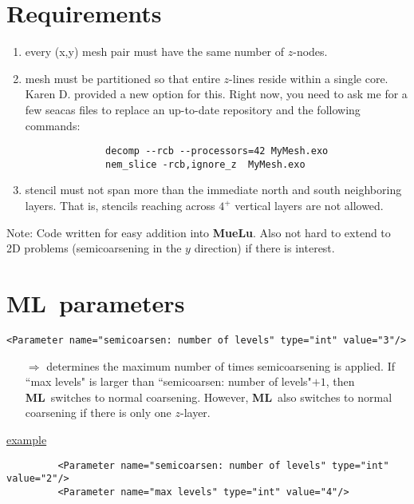 \documentclass{article}[11pt]
\newcommand{\ML}     {{\bf ML}}
\newcommand{\Mue}     {{\bf MueLu}}
\begin{document}
\section{Requirements}
%
\begin{enumerate}
\item every (x,y) mesh pair must have the same number of $z$-nodes. 
\item mesh must be partitioned so that entire $z$-lines reside within a
   single core. Karen D. provided a new option for this. Right now, you
   need to ask me for a few seacas files to replace an up-to-date 
   repository and the following commands:
\begin{verbatim}
              decomp --rcb --processors=42 MyMesh.exo
              nem_slice -rcb,ignore_z  MyMesh.exo
\end{verbatim}

\item stencil must not span more than the immediate north and south neighboring
   layers. That is, stencils reaching across $4^+$ vertical layers are not allowed.
\end{enumerate}
\noindent
Note: Code written for easy addition into \Mue. Also not hard to extend to 2D
      problems (semicoarsening in the $y$ direction) if there is interest.

%
\section{ \ML\  parameters}
%
\begin{verbatim}
<Parameter name="semicoarsen: number of levels" type="int" value="3"/>
\end{verbatim}

\begin{itemize}
   \item[$\Rightarrow$]
   determines the maximum number of times semicoarsening is applied.  If 
       ``max levels" is larger than ``semicoarsen: number of levels"$+ 1$, then  \ML\ 
       switches to normal coarsening. However,  \ML\  also switches to normal 
       coarsening if there is only one $z$-layer.
\end{itemize}

       \underline{example}

\begin{verbatim}
         <Parameter name="semicoarsen: number of levels" type="int" value="2"/>
         <Parameter name="max levels" type="int" value="4"/>
\end{verbatim}
\end{document}
